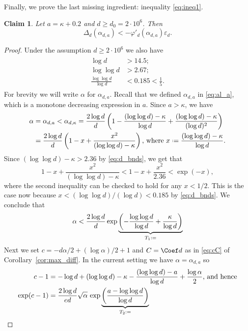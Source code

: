 \documentclass[12pt]{amsart}
\newtheorem{claim}[theorem]{Claim}
\theoremstyle{definition}
\newcommand\al{\alpha}
\newcommand\De{\Delta}
\newcommand\eps{\varepsilon}
\newcommand\ka{\kappa}
\newcommand{\defeq}{\mathrel{\vcenter{\baselineskip0.5ex \lineskiplimit0pt
                     \hbox{\scriptsize.}\hbox{\scriptsize.}}}%
                     =}
\begin{document}
Finally, we prove the last missing ingredient: inequality \eqref{eq:ineq1}.
%
\begin{claim} \label{cl:De_per_phider}
Let $a=\ka+0.2$ and $d \geq d_0 = 2 \cdot 10^6$. Then 
%
\[ \De_d(\al_{d,a}) < -\varphi'_d(\al_{d,a}) \eps_d .\]
%
\end{claim}
%
\begin{proof}
Under the assumption $d \geq 2 \cdot 10^6$ we also have
%
\begin{align}
\begin{split}
\log d &> 14.5 ;\\
\log \log d &> 2.67 ;\\
\frac{\log \log d}{\log d} &< 0.185 < \frac 15 . 
\label{eq:d_bnds}
\end{split}
\end{align}
%
For brevity we will write $\al$ for $\al_{d,a}$. Recall that we defined $\al_{d,a}$ in \eqref{eq:al_a}, which is a monotone decreasing expression in $a$. Since $a> \ka$, we have 
%
\begin{align*}
\al &= \al_{d,a} < \al_{d,\ka} 
= \frac{2 \log d}{d} 
\left( 1 - \frac{(\log\log d)-\ka}{\log d} 
+ \frac{(\log\log d) - \ka}{(\log d)^2} \right) \\
&= \frac{2 \log d}{d} 
\left( 1 - x + \frac{x^2}{(\log\log d) - \ka} \right) 
\text{, where } x \defeq \frac{(\log\log d)-\ka}{\log d} .
\end{align*} 
%
Since $(\log \log d)-\ka> 2.36$ by \eqref{eq:d_bnds}, we get that  
%
\[ 1-x+\frac{x^2}{(\log \log d)-\ka} 
< 1 - x + \frac{x^2}{2.36} < \exp(-x) ,\]
%
where the second inequality can be checked to hold for any $x<1/2$. This is the case now because $x<(\log\log d)/(\log d) <0.185$ by \eqref{eq:d_bnds}. We conclude that 
%
\begin{equation}
\label{eq:Tbound1}
    \al < \frac{2 \log d}{d} 
\exp \underbrace{ \left(- \frac{\log\log d}{\log d} 
+ \frac{\ka}{\log d} \right)}_{T_1 \defeq}  
\end{equation}
%
Next we set $c=-d\al/2+(\log \al)/2+1$ and $C = \Coef d$ as in \eqref{eq:cC} of Corollary~\ref{cor:max_diff}. In the current setting we have $\al=\al_{d,a}$ so  
%
\begin{align}
\begin{split}
c-1 &= -\log d + (\log\log d) - \ka 
- \frac{(\log\log d) - a}{\log d} + \frac{\log \al}{2} 
\text{, and hence} \\
\exp(c-1) &= \frac{2 \log d}{e d} \sqrt{\al} 
\,\exp\underbrace{ \left( 
\frac{a-\log\log d}{\log d} \right) }_{T_2 \defeq} \\

\end{split}
\end{align}
\end{proof}
\end{document}
